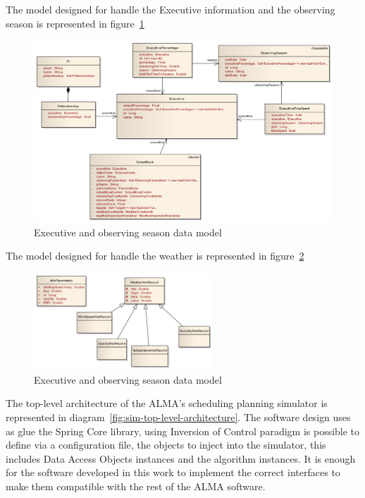 The model designed for handle the Executive information and the observing season is represented in figure~\ref{fig:datamodel-executive}

\begin{figure}[h!]	
\begin{center}
\includegraphics[width=\textwidth]{images/Executive}
\end{center}
\caption{Executive and observing season data model}
\label{fig:datamodel-executive}
\end{figure}

The model designed for handle the weather is represented in figure~\ref{fig:datamodel-weather}

\begin{figure}[h!]	
\begin{center}
\includegraphics[width=0.6\textwidth]{images/Weather}
\end{center}
\caption{Executive and observing season data model}
\label{fig:datamodel-weather}
\end{figure}

The top-level architecture of the ALMA's scheduling planning simulator is represented in diagram~\ref{fig:sim-top-level-architecture}. The software design uses as glue the Spring Core library, using Inversion of Control paradigm is possible to define via a configuration file, the objects to inject into the simulator, this includes Data Access Objects instances and the algorithm instances. It is enough for the software developed in this work to implement the correct interfaces to make them compatible with the rest of the ALMA software.

